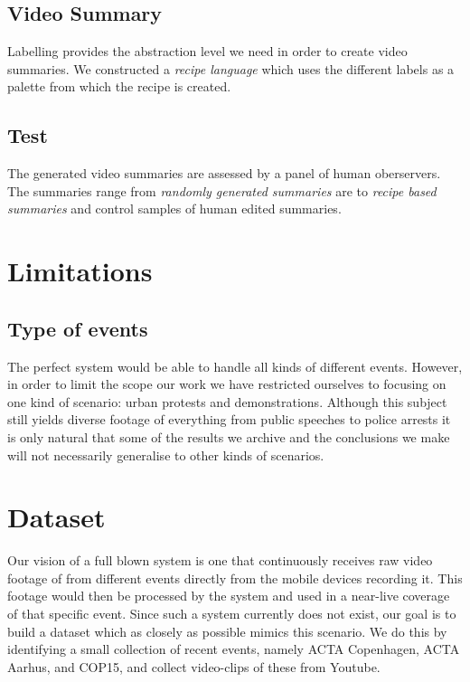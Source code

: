 \subsection{Video Summary}
%
Labelling provides the abstraction level we need in order to create video summaries. We constructed a \textit{recipe language} which uses the different labels as a palette from which the recipe is created. 
%
\subsection{Test}
%
The generated video summaries are assessed by a panel of human oberservers. The summaries range from \textit{randomly generated summaries} are to \textit{recipe based summaries} and control samples of human edited summaries. 
%
\section{Limitations}
%
%
%
%
\subsection{Type of events}
%
The perfect system would be able to handle all kinds of different events. However, in order to limit the scope our work we have restricted ourselves to focusing on one kind of scenario: urban protests and demonstrations. Although this subject still yields diverse footage of everything from public speeches to police arrests it is only natural that some of the results we archive and the conclusions we make will not necessarily generalise to other kinds of scenarios.
%
\section{Dataset}\label{sec:dataset}
%
Our vision of a full blown system is one that continuously receives raw video footage of from different events directly from the mobile devices recording it. This footage would then be processed by the system and used in a near-live coverage of that specific event. Since such a system currently does not exist, our goal is to build a dataset which as closely as possible mimics this scenario. We do this by identifying a small collection of recent events, namely ACTA Copenhagen, ACTA Aarhus, and COP15, and collect video-clips of these from Youtube.
%
